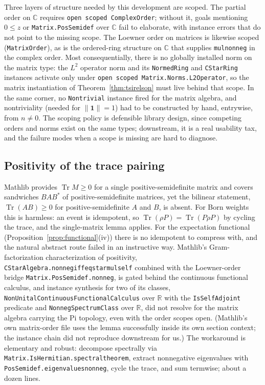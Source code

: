 \documentclass[11pt]{article}
\renewcommand{\_}{\textunderscore\allowbreak}
\theoremstyle{remark}
\newcommand{\C}{\mathbb C}
\newcommand{\R}{\mathbb R}
\newcommand{\Tr}{\operatorname{Tr}}
\newcommand{\norm}[1]{\lVert #1\rVert}
\newcommand{\one}{\mathbf 1}
\begin{document}
Three layers of structure needed by this development are scoped. The partial order on $\C$ requires \texttt{open scoped ComplexOrder}; without it, goals mentioning $0 \le z$ or \texttt{Matrix.PosSemidef} over $\C$ fail to elaborate, with instance errors that do not point to the missing scope. The Loewner order on matrices is likewise scoped (\texttt{MatrixOrder}), as is the ordered-ring structure on $\C$ that supplies \texttt{mul\_nonneg} in the complex order. Most consequentially, there is no globally installed norm on the matrix type: the $L^2$ operator norm and its \texttt{NormedRing} and \texttt{CStarRing} instances activate only under \texttt{open scoped Matrix.Norms.L2Operator}, so the matrix instantiation of Theorem~\ref{thm:tsirelson} must live behind that scope. In the same corner, no \texttt{Nontrivial} instance fired for the matrix algebra, and nontriviality (needed for $\norm{\one} = 1$) had to be constructed by hand, entrywise, from $n \neq 0$. The scoping policy is defensible library design, since competing orders and norms exist on the same types; downstream, it is a real usability tax, and the failure modes when a scope is missing are hard to diagnose.

\subsection{Positivity of the trace pairing}

Mathlib provides $\Tr M \ge 0$ for a single positive-semidefinite matrix and covers sandwiches $B A B^{*}$ of positive-semidefinite matrices, yet the bilinear statement, $\Tr(AB) \ge 0$ for positive-semidefinite $A$ and $B$, is absent. For Born weights this is harmless: an event is idempotent, so $\Tr(\rho P) = \Tr(P \rho P)$ by cycling the trace, and the single-matrix lemma applies. For the expectation functional (Proposition~\ref{prop:functional}(iv)) there is no idempotent to compress with, and the natural abstract route failed in an instructive way. Mathlib's Gram-factorization characterization of positivity, \texttt{CStarAlgebra.nonneg\_iff\_eq\_star\_mul\_self} combined with the Loewner-order bridge \texttt{Matrix.PosSemidef.nonneg}, is gated behind the continuous functional calculus, and instance synthesis for two of its classes, \texttt{NonUnitalContinuousFunctionalCalculus} over $\R$ with the \texttt{IsSelfAdjoint} predicate and \texttt{NonnegSpectrumClass} over $\R$, did not resolve for the matrix algebra carrying the Pi topology, even with the order scopes open. (Mathlib's own matrix-order file uses the lemma successfully inside its own section context; the instance chain did not reproduce downstream for us.) The workaround is elementary and robust: decompose spectrally via \texttt{Matrix.IsHermitian.spectral\_theorem}, extract nonnegative eigenvalues with \texttt{PosSemidef.eigenvalues\_nonneg}, cycle the trace, and sum termwise; about a dozen lines.
\end{document}
